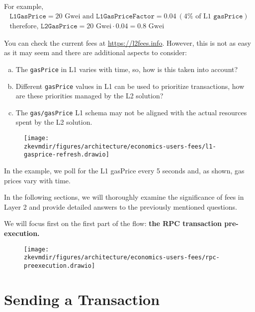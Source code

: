 For example,
\begin{gather*}
\texttt{L1GasPrice} = 20 \text{ Gwei} \text{ and } \texttt{L1GasPriceFactor} = 0.04 \ (4\% \text{ of L1 } \texttt{gasPrice}) \\
\text{therefore, } \texttt{L2GasPrice} = 20 \text{ Gwei} \cdot 0.04 =  0.8 \text{ Gwei}
\end{gather*}

You can check the current fees at \url{https://l2fees.info}. However, this is not as easy as it may seem and there are additional aspects to consider:

\begin{enumerate}[a)]
\item The \texttt{gasPrice} in L1 varies with time, so, how is this taken into account?

\vspace{0.1cm}
\item Different \texttt{gasPrice} values in L1 can be used to prioritize transactions,
how are these priorities managed by the L2 solution?

\vspace{0.1cm}
\item The \texttt{gas/gasPrice} L1 schema may not be aligned with the actual
resources spent by the L2 solution.
\end{enumerate}

\begin{figure}[H]
\centering
\texttt{[image: \\zkevmdir/figures/architecture/economics-users-fees/l1-gasprice-refresh.drawio]}
\end{figure}

In the example, we poll for the L1 gasPrice every 5 seconds and, as shown, gas prices vary with time.

In the following sections, we will thoroughly examine the significance of fees in Layer 2 and provide detailed answers to the previously mentioned questions.

We will focus first on the first part of the flow: \textbf{the RPC transaction pre-execution.}

\begin{figure}[H]
\centering
\texttt{[image: \\zkevmdir/figures/architecture/economics-users-fees/rpc-preexecution.drawio]}
\end{figure}


\section{Sending a Transaction}

